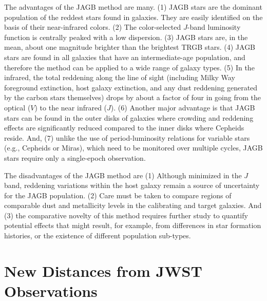 \documentclass[12pt,modern]{aastex631}
\begin{document}
The advantages of the JAGB method are many. (1) JAGB stars are the dominant population of the reddest stars found in galaxies. They are easily identified on the basis of their near-infrared colors. (2) The color-selected $J$-band luminosity function is centrally peaked with a low dispersion. (3) JAGB stars are, in the mean, about one magnitude brighter than the brightest TRGB stars. (4) JAGB stars are found in all galaxies that have an intermediate-age population, and therefore the method can be applied to a wide range of galaxy types. (5) In the infrared, the total  reddening along the line of sight (including Milky Way foreground extinction, host galaxy extinction, and any dust reddening generated by the carbon stars themselves) drops by about a factor of four in going from the optical ($V$) to the near infrared ($J$). (6) Another major advantage is that JAGB stars can be found in the outer disks of galaxies where crowding and reddening effects are significantly reduced compared to the inner disks where Cepheids reside. And, (7) unlike the use of period-luminosity relations for variable stars (e.g., Cepheids or Miras), which need to be monitored over multiple cycles, JAGB  stars require only a single-epoch observation. 

The disadvantages of the JAGB method are (1) Although minimized in the $J$ band, reddening variations within the host galaxy remain a source of uncertainty for the JAGB population. (2) Care must be taken to compare regions of comparable dust and metallicity levels in the calibrating and target galaxies. And (3) the comparative novelty of this method requires further study to quantify potential effects that might result, for example, from differences in star formation histories, or the existence of different population sub-types.


\medskip\medskip\medskip\medskip\medskip\medskip\medskip\medskip

\section{New Distances from JWST Observations}
\label{sec:jwstdistances}
\end{document}
